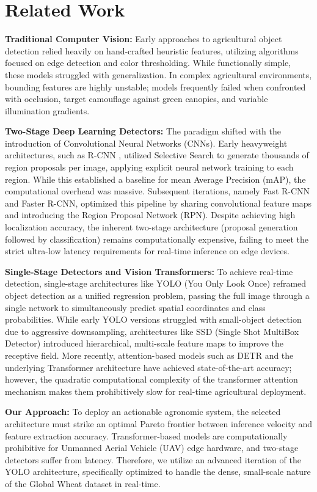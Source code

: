 \section{Related Work}
\label{sec:related}

\textbf{Traditional Computer Vision:} Early approaches to agricultural object detection relied heavily on hand-crafted heuristic features, utilizing algorithms focused on edge detection and color thresholding. While functionally simple, these models struggled with generalization. In complex agricultural environments, bounding features are highly unstable; models frequently failed when confronted with occlusion, target camouflage against green canopies, and variable illumination gradients.

\textbf{Two-Stage Deep Learning Detectors:} The paradigm shifted with the introduction of Convolutional Neural Networks (CNNs). Early heavyweight architectures, such as R-CNN \cite{girshick2014rich}, utilized Selective Search to generate thousands of region proposals per image, applying explicit neural network training to each region. While this established a baseline for mean Average Precision (mAP), the computational overhead was massive. Subsequent iterations, namely Fast R-CNN and Faster R-CNN, optimized this pipeline by sharing convolutional feature maps and introducing the Region Proposal Network (RPN). Despite achieving high localization accuracy, the inherent two-stage architecture (proposal generation followed by classification) remains computationally expensive, failing to meet the strict ultra-low latency requirements for real-time inference on edge devices.

\textbf{Single-Stage Detectors and Vision Transformers:} To achieve real-time detection, single-stage architectures like YOLO (You Only Look Once) \cite{redmon2016you} reframed object detection as a unified regression problem, passing the full image through a single network to simultaneously predict spatial coordinates and class probabilities. While early YOLO versions struggled with small-object detection due to aggressive downsampling, architectures like SSD (Single Shot MultiBox Detector) introduced hierarchical, multi-scale feature maps to improve the receptive field. More recently, attention-based models such as DETR \cite{carion2020end} and the underlying Transformer architecture \cite{vaswani2017attention} have achieved state-of-the-art accuracy; however, the quadratic computational complexity of the transformer attention mechanism makes them prohibitively slow for real-time agricultural deployment.

\textbf{Our Approach:} To deploy an actionable agronomic system, the selected architecture must strike an optimal Pareto frontier between inference velocity and feature extraction accuracy. Transformer-based models are computationally prohibitive for Unmanned Aerial Vehicle (UAV) edge hardware, and two-stage detectors suffer from latency. Therefore, we utilize an advanced iteration of the YOLO architecture, specifically optimized to handle the dense, small-scale nature of the Global Wheat dataset in real-time.